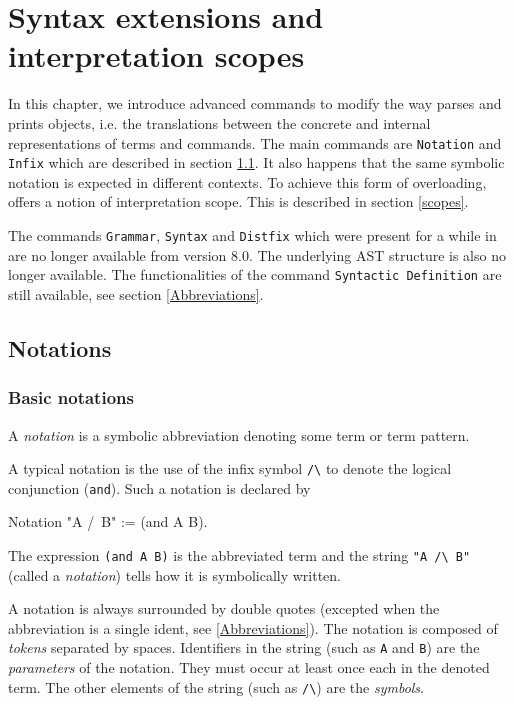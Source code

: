 \chapter{Syntax extensions and interpretation scopes}
\label{Addoc-syntax}

In this chapter, we introduce advanced commands to modify the way
{\Coq} parses and prints objects, i.e. the translations between the
concrete and internal representations of terms and commands. The main
commands are {\tt Notation} and {\tt Infix} which are described in
section \ref{Notation}.  It also happens that the same symbolic
notation is expected in different contexts. To achieve this form of
overloading, {\Coq} offers a notion of interpretation scope. This is
described in section \ref{scopes}.

\Rem The commands {\tt Grammar}, {\tt Syntax} and {\tt Distfix} which
were present for a while in {\Coq} are no longer available from {\Coq}
version 8.0. The underlying AST structure is also no longer available.
The functionalities of the command {\tt Syntactic Definition} are
still available, see section \ref{Abbreviations}.

\section{Notations}
\label{Notation}

\subsection{Basic notations}

A {\em notation} is a symbolic abbreviation denoting some term
or term pattern.

A typical notation is the use of the infix symbol \verb=/\= to denote
the logical conjunction (\texttt{and}). Such a notation is declared
by

\begin{coq_example*}
Notation "A /\ B" := (and A B).
\end{coq_example*}

The expression \texttt{(and A B)} is the abbreviated term and the
string \verb="A /\ B"= (called a {\em notation}) tells how it is 
symbolically written.

A notation is always surrounded by double quotes (excepted when the
abbreviation is a single ident, see \ref{Abbreviations}). The
notation is composed of {\em tokens} separated by spaces.  Identifiers
in the string (such as \texttt{A} and \texttt{B}) are the {\em
parameters} of the notation. They must occur at least once each in the
denoted term. The other elements of the string (such as \verb=/\=) are
the {\em symbols}.

